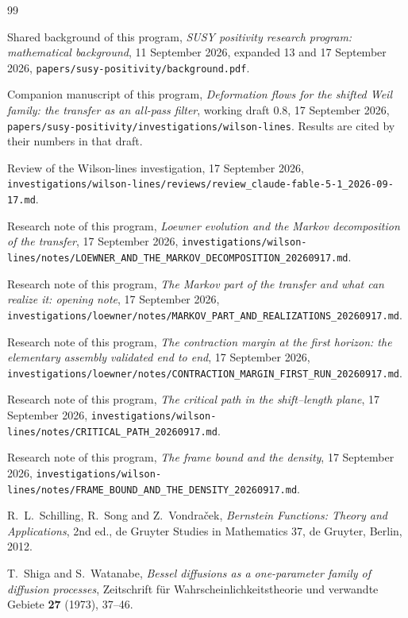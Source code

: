 \begin{thebibliography}{99}
\raggedright
{}
Shared background of this program, \emph{SUSY positivity research program:
mathematical background}, 11 September 2026, expanded 13 and 17 September 2026,
\texttt{papers/susy-positivity/background.pdf}.

Companion manuscript of this program, \emph{Deformation flows for the shifted
Weil family: the transfer as an all-pass filter}, working draft 0.8,
17 September 2026,
\texttt{papers/susy-positivity/investigations/wilson-lines}. Results are cited
by their numbers in that draft.

Review of the Wilson-lines investigation, 17 September 2026,
\texttt{investigations/wilson-lines/reviews/\allowbreak review\_claude-fable-5-1\_2026-09-17.md}.

Research note of this program, \emph{Loewner evolution and the Markov
decomposition of the transfer}, 17 September 2026,
\texttt{investigations/wilson-lines/notes/\allowbreak LOEWNER\_AND\_THE\_MARKOV\_DECOMPOSITION\_20260917.md}.

Research note of this program, \emph{The Markov part of the transfer and what
can realize it: opening note}, 17 September 2026,
\texttt{investigations/loewner/notes/\allowbreak MARKOV\_PART\_AND\_REALIZATIONS\_20260917.md}.

Research note of this program, \emph{The contraction margin at the first
horizon: the elementary assembly validated end to end}, 17 September 2026,
\texttt{investigations/loewner/notes/\allowbreak CONTRACTION\_MARGIN\_FIRST\_RUN\_20260917.md}.

Research note of this program, \emph{The critical path in the shift--length
plane}, 17 September 2026,
\texttt{investigations/wilson-lines/notes/CRITICAL\_PATH\_20260917.md}.

Research note of this program, \emph{The frame bound and the density},
17 September 2026,
\texttt{investigations/wilson-lines/notes/\allowbreak FRAME\_BOUND\_AND\_THE\_DENSITY\_20260917.md}.

R.~L.~Schilling, R.~Song and Z.~Vondra\v{c}ek, \emph{Bernstein Functions:
Theory and Applications}, 2nd ed., de Gruyter Studies in Mathematics 37,
de Gruyter, Berlin, 2012.

T.~Shiga and S.~Watanabe, \emph{Bessel diffusions as a one-parameter family of
diffusion processes}, Zeitschrift f\"ur Wahrscheinlichkeitstheorie und
verwandte Gebiete \textbf{27} (1973), 37--46.


\end{thebibliography}
